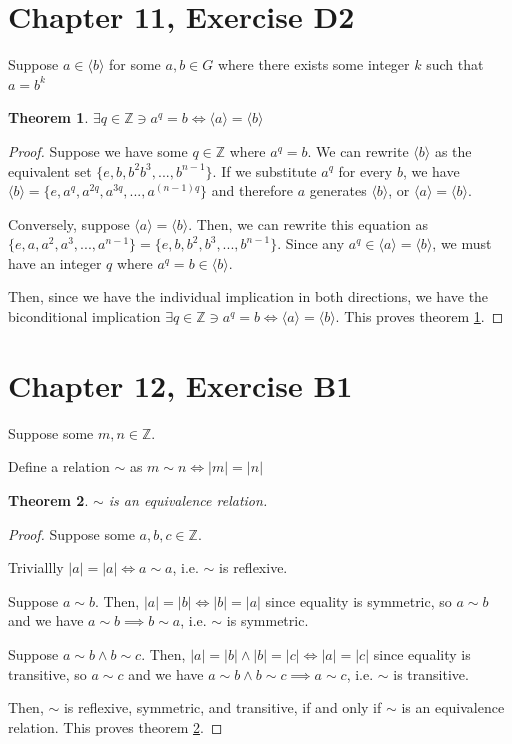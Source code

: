 \documentclass[12pt]{article}
\newcommand{\ints}{\mathbb{Z}}
\newtheorem{thm}{Theorem}
\begin{document}
\section{Chapter 11, Exercise D2}

Suppose $a \in \langle b \rangle$ for some $a,b \in G$
where there exists some integer $k$ such that $a = b^k$

\begin{thm} \label{thm12}
	$\exists q \in \ints \ni a^q = b \iff \langle a \rangle = \langle b \rangle$
\end{thm}

\begin{proof}
	Suppose we have some $q \in \ints$
	where $a^q = b$.
	We can rewrite $\langle b \rangle$
	as the equivalent set $\{ e, b, b^2 b^3, ..., b^{n-1} \}$.
	If we substitute $a^q$ for every $b$,
	we have $\langle b \rangle = \{e, a^q, a^{2q}, a^{3q}, ..., a^{(n-1)q} \}$
	and therefore $a$ generates $\langle b \rangle$,
	or $\langle a \rangle = \langle b \rangle$.

	Conversely, suppose $\langle a \rangle = \langle b \rangle$.
	Then, we can rewrite this equation as
	$\{e, a, a^2, a^3, ..., a^{n-1} \} = \{e, b, b^2, b^3, ..., b^{n-1} \}$.
	Since any $a^q \in \langle a \rangle = \langle b \rangle$,
	we must have an integer $q$ where $a^q = b \in \langle b \rangle$.

	Then, since we have the individual implication in both directions,
	we have the biconditional implication
	$\exists q \in \ints \ni a^q = b \iff \langle a \rangle = \langle b \rangle$.
	This proves theorem \ref{thm12}.
\end{proof}

\section{Chapter 12, Exercise B1}

Suppose some $m,n \in \ints$.

Define a relation $\sim$ as $m \sim n \iff |m| = |n|$

\begin{thm} \label{thm9}
	$\sim$ is an equivalence relation.
\end{thm}

\begin{proof}
	Suppose some $a,b,c \in \ints$.

	Triviallly $|a| = |a| \iff a \sim a$,
	i.e. $\sim$ is reflexive.

	Suppose $a \sim b$.
	Then, $|a| = |b| \iff |b| = |a|$
	since equality is symmetric,
	so $a \sim b$
	and we have $a \sim b \implies b \sim a$,
	i.e. $\sim$ is symmetric.

	Suppose $a \sim b \land b \sim c$.
	Then, $|a| = |b| \land |b| = |c| \iff |a| = |c|$
	since equality is transitive,
	so $a \sim c$
	and we have $a \sim b \land b \sim c \implies a \sim c$,
	i.e. $\sim$ is transitive.

	Then,
	$\sim$ is
	reflexive,
	symmetric,
	and transitive,
	if and only if
	$\sim$ is an equivalence relation.
	This proves theorem \ref{thm9}.
\end{proof}
\end{document}
